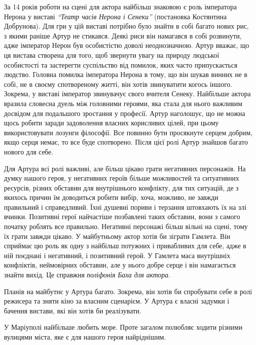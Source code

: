
За 14 років роботи на сцені для актора найбільш знаковою є роль імператора
Нерона у виставі \emph{\enquote{Театр часів Нерона і Сенеки}} (постановка Костянтина
Добрунова). Для гри у цій виставі потрібно було знайти в собі багато нових рис,
з якими раніше Артур не стикався. Деякі риси він намагався в собі розвинути,
адже імператор Нерон був особистістю доволі неоднозначною. Артур вважає, що ця
вистава створена для того,  щоб звернути увагу на природу людської особистості
та застерегти суспільство від помилок, яких часто припускається людство.
Головна помилка імператора Нерона в тому, що він шукав винних не в собі, не в
своєму спотвореному житті, він хотів звинуватити когось іншого. Зокрема, у
виставі імператор звинувачує свого вчителя Сенеку. Найбільше актора вразила
словесна дуель між головними героями, яка стала для нього важливим досвідом для
подальшого зростання у професії. Артур наголошує, що не можна щось робити
заради задоволення власних корисливих цілей, при цьому використовувати лозунги
філософії. Все повинно бути просякнуте серцем добрим, якщо серця немає, то все
буде спотворено. Після цієї ролі Артур знайшов багато нового для себе.

Для Артура всі ролі важливі, але більш цікаво грати негативних персонажів. На
думку нашого героя, у негативних героїв більше можливостей та ситуативних
ресурсів, різних обставин для внутрішнього конфлікту, для тих ситуацій, де з
якихось причин їм доводиться робити вибір, хоча, можливо, не завжди правильний
і справедливий. Їхні душевні пориви і терзання штовхають їх на злі вчинки.
Позитивні герої найчастіше позбавлені таких обставин, вони з самого початку
роблять все правильно. Негативні персонажі більш вільні на сцені, тому їх грати
завжди цікаво. У майбутньому актор хотів би зіграти Гамлета. Він сприймає цю
роль як одну з найбільш потужних і привабливих для себе, адже в ній поєднані і
негативний, і позитивний герой. У Гамлета маса внутрішніх конфліктів,
неймовірних обставин, але у нього добре серце і він намагається знайти вихід.
Це справжня \emph{поліфонія Баха для актора}.


Планів на майбутнє у Артура багато. Зокрема, він хотів би спробувати себе в
ролі режисера та зняти кіно за власним сценарієм. У Артура є власні задумки і
бачення вистави, які він хотів би реалізувати.

У Маріуполі найбільше любить море. Проте загалом полюбляє ходити різними
вулицями міста, яке є для нашого героя найріднішим.  

